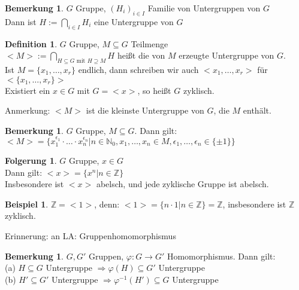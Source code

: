 \documentclass[10pt,a4paper,numbers=endperiod]{scrreprt}
\theoremstyle{definition}
\newtheorem{defi}[satz]{Definition}
\newtheorem{bem}[satz]{Bemerkung}
\newtheorem{bsp}[satz]{Beispiel}
\newtheorem{folg}[satz]{Folgerung}
\def\NN{{\mathbb N}}
\def\ZZ{{\mathbb Z}}
\begin{document}
\begin{bem}
	$G$ Gruppe, $(H_i)_{i \in I}$ Familie von Untergruppen von $G$\\
	Dann ist $H := \bigcap\limits_{i \in I} H_i$ eine Untergruppe von $G$\\
\end{bem}

\begin{defi}
	$G$ Gruppe, $M \subseteq G$ Teilmenge\\
	$<M> := \bigcap\limits_{H \subseteq G \text{ mit } H \supseteq M} H$ heißt die von $M$ erzeugte Untergruppe von $G$.\\
	Ist $M = \{x_1, \ldots, x_r\}$ endlich, dann schreiben wir auch $<x_1, \ldots, x_r>$ für $<\{x_1, \ldots, x_r\}>$\\
	Existiert ein $x \in G$ mit $G = <x>$, so heißt $G$ zyklisch.
\end{defi}

Anmerkung: $<M>$ ist die kleinste Untergruppe von $G$, die $M$ enthält. 

\begin{bem}
	$G$ Gruppe, $M \subseteq G$. Dann gilt:\\
	$<M> = \{x_1^{\epsilon_1} \cdot \ldots \cdot x_n^{\epsilon_n} | n \in \NN_0, x_1, \ldots, x_n \in M, \epsilon_1, \ldots, \epsilon_n \in \{\pm 1\}\}$
\end{bem}

\begin{folg}
	$G$ Gruppe, $x \in G$\\
	Dann gilt: $<x> = \{x^n | n \in \ZZ\}$\\
	Insbesondere ist $<x>$ abelsch, und jede zyklische Gruppe ist abelsch.
\end{folg}

\begin{bsp}
	$\ZZ = <1>$, denn: $<1> = \{n \cdot 1| n \in \ZZ\} = \ZZ$, insbesondere ist $\ZZ$ zyklisch. 
\end{bsp}

Erinnerung: an LA: Gruppenhomomorphismus

\begin{bem}
	$G, G'$ Gruppen, $\varphi: G \rightarrow G'$ Homomorphismus. Dann gilt:\\
	(a) $H \subseteq G$ Untergruppe $\Rightarrow \varphi(H) \subseteq G'$ Untergruppe\\
	(b) $H' \subseteq G'$ Untergruppe $\Rightarrow \varphi^{-1} (H') \subseteq G$ Untergruppe
\end{bem}
\end{document}
